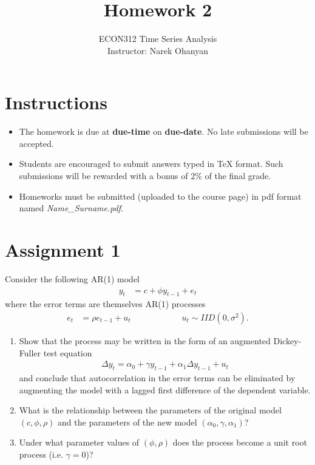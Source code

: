 \documentclass[12pt]{article}
\title{\textbf{Homework 2}}
\author{ECON312 Time Series Analysis \\ Instructor: Narek Ohanyan}
\date{}
\begin{document}
\maketitle


\section*{Instructions}

\begin{itemize}
    \item The homework is due at \textbf{due-time} on \textbf{due-date}. No late submissions will be accepted.
    \item Students are encouraged to submit answers typed in TeX format. Such submissions will be rewarded with a bonus of 2\% of the final grade.
    \item Homeworks must be submitted (uploaded to the course page) in pdf format named \textit{Name\_Surname.pdf}.
\end{itemize}


\section*{Assignment 1}

Consider the following AR(1) model
\begin{align*}
    y_{t} & = c + \phi y_{t-1} + e_{t}
\end{align*}
where the error terms are themselves AR(1) processes
\begin{align*}
    e_{t} & = \rho e_{t-1} + u_{t} \qquad\qquad\qquad u_{t} \sim IID(0,\sigma^2).
\end{align*}

\begin{enumerate}
    \item Show that the process may be written in the form of an augmented Dickey-Fuller test equation
          \begin{align*}
              \Delta y_{t} = \alpha_0 + \gamma y_{t-1} + \alpha_1 \Delta y_{t-1} + u_{t}
          \end{align*}
          and conclude that autocorrelation in the error terms can be eliminated by augmenting the model with a lagged first difference of the dependent variable.
    \item What is the relationship between the parameters of the original model $ \left( c, \phi, \rho \right) $ and the parameters of the new model $ \left( \alpha_0, \gamma, \alpha_1 \right) $?
    \item Under what parameter values of $ \left( \phi, \rho \right) $ does the process become a unit root process (i.e. $ \gamma = 0 $)?
\end{enumerate}

\end{document}
